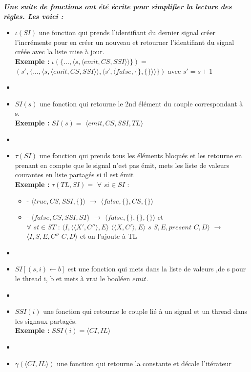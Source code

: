 \documentclass[10pt,a4paper]{article}
\begin{document}
				\textbf{\textit{Une suite de fonctions ont été écrite pour simplifier la lecture des règles. Les voici :}}
				\smallbreak
				\begin{itemize}
					\item[] $\iota(SI)$ une fonction qui prends l'identifiant du dernier signal créer l'incrémente pour en créer un nouveau et retourner l'identifiant du signal créée avec la liste mise à jour.
					\\ \textbf{Exemple :} $\iota(\{...,\langle s,\langle emit,CS,SSI\rangle\rangle\}) =$ $(s' ,\{...,\langle s,\langle emit,CS,SSI\rangle\rangle,\langle s',\langle false,\{\},\{\}\rangle\rangle\})$ avec $s' = s+1$
					\item[] 
					\item[] $SI(s)$ une fonction qui retourne le 2nd élément du couple correspondant à s.
					\\\textbf{Exemple :} $SI(s) =$ $\langle emit,CS,SSI,TL\rangle$
					\item[]  
					\item[] $\tau(SI)$ une fonction qui prends tous les éléments bloqués et les retourne en prenant en compte que le signal n'est pas émit, mets les liste de valeurs courantes en liste partagés si il est émit 
					\\ \textbf{Exemple :} $\tau(TL,SI) =$ $\forall$ $si \in SI$ : 
					\begin{itemize}
						\item[] - $\langle true,CS,SSI,\{\}\rangle$ $\rightarrow$ $\langle false,\{\},CS,\{\}\rangle$
						\item[] - $\langle false,CS,SSI,ST\rangle$ $\rightarrow$ $\langle false,\{\},\{\},\{\}\rangle$ et 
						\\$\forall$ $st \in ST$ : $\langle I,\langle\langle X',C''\rangle, E\rangle$ $\langle\langle X,C'\rangle, E\rangle$ $s$ $S,E,present$ $C,D\rangle$ $\rightarrow$ $ \langle I,S,E,C''$ $C,D\rangle$ et on l'ajoute à TL
					\end{itemize}
					\item[]
					\item[] $SI[(s,i) \leftarrow b]$ est une fonction qui mets dans la liste de valeurs ,de s pour le thread i, b et mets à vrai le booléen $emit$.
					\item[] 
					\item[] $SSI(i)$ une fonction qui retourne le couple lié à un signal et un thread dans les signaux partagés.
					\\ \textbf{Exemple :} $SSI(i) = \langle CI,IL\rangle$
					\item[] 
					\item[] $\gamma(\langle CI,IL\rangle)$ une fonction qui retourne la constante et décale l'itérateur 
				\end{itemize}
				\newpage
				
\end{document}
